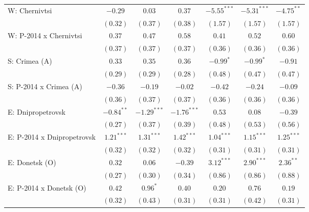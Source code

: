\begin{table}
\begin{center}
\begin{small}
\begin{tabular}{l c c c c c c}
W: Chernivtsi               & $-0.29$       & $0.03$        & $0.37$         & $-5.55^{***}$ & $-5.31^{***}$ & $-4.75^{**}$  \\
                            & $(0.32)$      & $(0.37)$      & $(0.38)$       & $(1.57)$      & $(1.57)$      & $(1.57)$      \\
W: P-2014 x Chernivtsi      & $0.37$        & $0.47$        & $0.58$         & $0.41$        & $0.52$        & $0.60$        \\
                            & $(0.37)$      & $(0.37)$      & $(0.37)$       & $(0.36)$      & $(0.36)$      & $(0.36)$      \\
S: Crimea (A)               & $0.33$        & $0.35$        & $0.36$         & $-0.99^{*}$   & $-0.99^{*}$   & $-0.91$       \\
                            & $(0.29)$      & $(0.29)$      & $(0.28)$       & $(0.48)$      & $(0.47)$      & $(0.47)$      \\
S: P-2014 x Crimea (A)      & $-0.36$       & $-0.19$       & $-0.02$        & $-0.42$       & $-0.24$       & $-0.09$       \\
                            & $(0.36)$      & $(0.37)$      & $(0.37)$       & $(0.36)$      & $(0.36)$      & $(0.36)$      \\
E: Dnipropetrovsk           & $-0.84^{**}$  & $-1.29^{***}$ & $-1.76^{***}$  & $0.53$        & $0.08$        & $-0.39$       \\
                            & $(0.27)$      & $(0.37)$      & $(0.39)$       & $(0.48)$      & $(0.53)$      & $(0.56)$      \\
E: P-2014 x Dnipropetrovsk  & $1.21^{***}$  & $1.31^{***}$  & $1.42^{***}$   & $1.04^{***}$  & $1.15^{***}$  & $1.25^{***}$  \\
                            & $(0.32)$      & $(0.32)$      & $(0.32)$       & $(0.31)$      & $(0.31)$      & $(0.31)$      \\
E: Donetsk (O)              & $0.32$        & $0.06$        & $-0.39$        & $3.12^{***}$  & $2.90^{***}$  & $2.36^{**}$   \\
                            & $(0.27)$      & $(0.30)$      & $(0.34)$       & $(0.86)$      & $(0.86)$      & $(0.88)$      \\
E: P-2014 x Donetsk (O)     & $0.42$        & $0.96^{*}$    & $0.40$         & $0.20$        & $0.76$        & $0.19$        \\
                            & $(0.32)$      & $(0.43)$      & $(0.31)$       & $(0.31)$      & $(0.42)$      & $(0.31)$      \\

\end{tabular}
\end{small}
\end{center}
\end{table}
